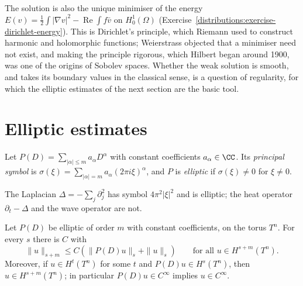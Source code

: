 The solution is also the unique minimiser of the energy $E(v) = \frac12\int|\nabla v|^2 - \operatorname{Re}\int f\bar v$ on $H^1_0(\Omega)$ (Exercise~\ref{distributions:exercise-dirichlet-energy}). This is
Dirichlet's principle, which Riemann used to construct harmonic and holomorphic functions; Weierstrass objected that a minimiser need not exist, and making the principle rigorous, which Hilbert
began around 1900, was one of the origins of Sobolev spaces. Whether the weak solution is smooth, and takes its boundary values in the classical sense, is a question of regularity, for which the
elliptic estimates of the next section are the basic tool.

\section{Elliptic estimates}\label{distributions:section-elliptic}

\begin{definition}\label{distributions:definition-elliptic-constant}
Let $P(D) = \sum_{|\alpha| \leq m}a_\alpha D^\alpha$ with constant coefficients $a_\alpha \in \CC$. Its \emph{principal symbol} is $\sigma(\xi) = \sum_{|\alpha| = m}a_\alpha(2\pi i\xi)^\alpha$, and $P$ is
\emph{elliptic} if $\sigma(\xi) \neq 0$ for $\xi \neq 0$.
\end{definition}

\begin{example}\label{distributions:example-laplacian}
The Laplacian $\Delta = -\sum_j\partial_j^2$ has symbol $4\pi^2|\xi|^2$ and is elliptic; the heat operator $\partial_t - \Delta$ and the wave operator are not.
\end{example}

\begin{theorem}\label{distributions:theorem-elliptic-estimate}
Let $P(D)$ be elliptic of order $m$ with constant coefficients, on the torus $T^n$. For every $s$ there is $C$ with
\[
\|u\|_{s+m} \leq C\left(\|P(D)u\|_s + \|u\|_s\right) \qquad \text{for all } u \in H^{s+m}(T^n).
\]
Moreover, if $u \in H^t(T^n)$ for some $t$ and $P(D)u \in H^s(T^n)$, then $u \in H^{s+m}(T^n)$; in particular $P(D)u \in C^\infty$ implies $u \in C^\infty$.
\end{theorem}

